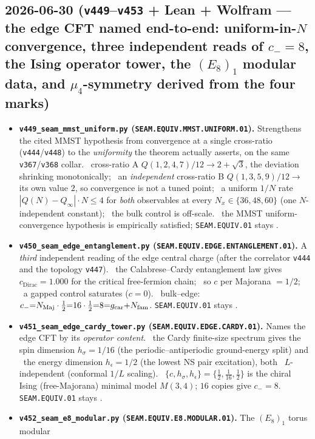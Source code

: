 \subsection*{2026-06-30 (\texttt{v449}--\texttt{v453} + Lean + Wolfram --- the edge CFT named end-to-end: uniform-in-$N$ convergence, three independent reads of $c_-{=}8$, the Ising operator tower, the $(E_8)_1$ modular data, and $\mu_4$-symmetry derived from the four marks)}
\begin{itemize}
\item \textbf{\texttt{v449\_seam\_mmst\_uniform.py} (\texttt{SEAM.EQUIV.MMST.UNIFORM.01}).} Strengthens the cited MMST
hypothesis from convergence at a single cross-ratio (\texttt{v444}/\texttt{v448}) to the \emph{uniformity} the theorem
actually asserts, on the same \texttt{v367}/\texttt{v368} collar. \mE\ cross-ratio A $Q(1,2,4,7)/12\to2{+}\sqrt3$, the
deviation shrinking monotonically; \mE\ an \emph{independent} cross-ratio B $Q(1,3,5,9)/12\to$ its own value $2$, so
convergence is not a tuned point; \mE\ a uniform $1/N$ rate $|Q(N){-}Q_\infty|\cdot N\le4$ for \emph{both} observables
at every $N_x\in\{36,48,60\}$ (one $N$-independent constant); \mE\ the bulk control is off-scale. \mC\ the MMST
uniform-convergence hypothesis is empirically satisfied; \texttt{SEAM.EQUIV.01} stays \mO.
\item \textbf{\texttt{v450\_seam\_edge\_entanglement.py} (\texttt{SEAM.EQUIV.EDGE.ENTANGLEMENT.01}).} A \emph{third}
independent reading of the edge central charge (after the correlator \texttt{v444} and the topology \texttt{v447}).
\mE\ the Calabrese--Cardy entanglement law gives $c_{\mathrm{Dirac}}{=}1.000$ for the critical free-fermion chain;
\mE\ so $c$ per Majorana $=1/2$; \mE\ a gapped control saturates ($c{=}0$). \mC\ bulk--edge:
$c_-{=}N_{\mathrm{Maj}}\cdot\tfrac12{=}16\cdot\tfrac12{=}8{=}g_{\mathrm{car}}{+}N_{\mathrm{fam}}$. \texttt{SEAM.EQUIV.01} stays \mO.
\item \textbf{\texttt{v451\_seam\_edge\_cardy\_tower.py} (\texttt{SEAM.EQUIV.EDGE.CARDY.01}).} Names the edge CFT by its
\emph{operator content}. \mE\ the Cardy finite-size spectrum gives the spin dimension $h_\sigma{=}1/16$ (the
periodic--antiperiodic ground-energy split) and \mE\ the energy dimension $h_\epsilon{=}1/2$ (the lowest NS pair
excitation), both \mE\ $L$-independent (conformal $1/L$ scaling). \mC\ $\{c,h_\sigma,h_\epsilon\}{=}\{\tfrac12,
\tfrac1{16},\tfrac12\}$ is the chiral Ising (free-Majorana) minimal model $M(3,4)$; $16$ copies give
$c_-{=}8$. \texttt{SEAM.EQUIV.01} stays \mO.
\item \textbf{\texttt{v452\_seam\_e8\_modular.py} (\texttt{SEAM.EQUIV.E8.MODULAR.01}).} The $(E_8)_1$ torus modular

\end{itemize}
